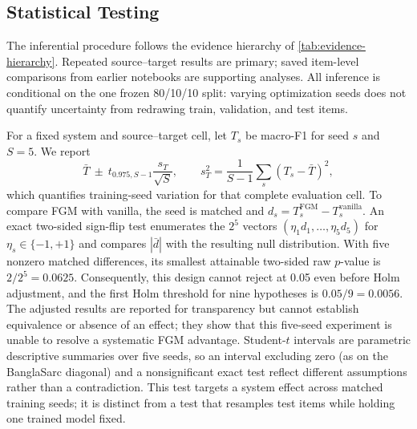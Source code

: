 \documentclass{ieeeaccess}
\begin{document}
\subsection{Statistical Testing}
\label{sec:stat-tests}

The inferential procedure follows the evidence hierarchy of \cref{tab:evidence-hierarchy}. Repeated source--target results are primary; saved item-level comparisons from earlier notebooks are supporting analyses. All inference is conditional on the one frozen 80/10/10 split: varying optimization seeds does not quantify uncertainty from redrawing train, validation, and test items.

For a fixed system and source--target cell, let $T_s$ be macro-F1 for seed $s$ and $S=5$. We report
\begin{equation}
\bar T\ \pm\ t_{0.975,S-1}\frac{s_T}{\sqrt S},
\qquad
s_T^2=\frac{1}{S-1}\sum_s(T_s-\bar T)^2,
\label{eq:seed-ci}
\end{equation}
which quantifies training-seed variation for that complete evaluation cell. To compare FGM with vanilla, the seed is matched and $d_s=T^{\mathrm{FGM}}_s-T^{\mathrm{vanilla}}_s$. An exact two-sided sign-flip test enumerates the $2^5$ vectors $(\eta_1d_1,\ldots,\eta_5d_5)$ for $\eta_s\in\{-1,+1\}$ and compares $|\bar d|$ with the resulting null distribution. With five nonzero matched differences, its smallest attainable two-sided raw $p$-value is $2/2^5=0.0625$. Consequently, this design cannot reject at 0.05 even before Holm adjustment, and the first Holm threshold for nine hypotheses is $0.05/9=0.0056$. The adjusted results are reported for transparency but cannot establish equivalence or absence of an effect; they show that this five-seed experiment is unable to resolve a systematic FGM advantage. Student-$t$ intervals are parametric descriptive summaries over five seeds, so an interval excluding zero (as on the BanglaSarc diagonal) and a nonsignificant exact test reflect different assumptions rather than a contradiction. This test targets a system effect across matched training seeds; it is distinct from a test that resamples test items while holding one trained model fixed.
\end{document}
